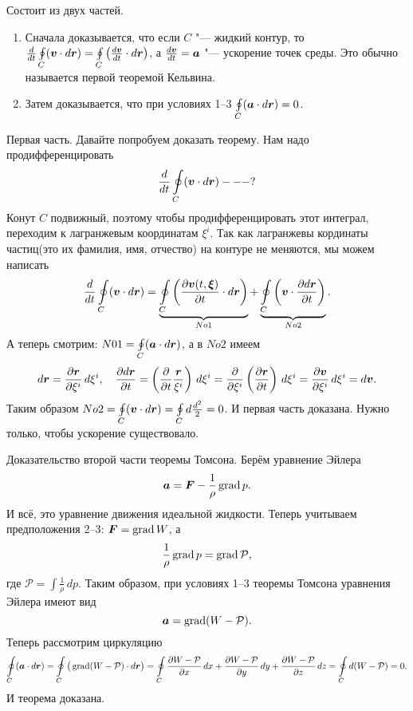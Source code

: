\begin{Proof}
 Состоит из двух частей.
\begin{enumerate}
  \item Сначала доказывается, что если $C$ "--- жидкий контур, то $\frac{d}{dt}\oint\limits_C(\boldsymbol{v}\cdot d\boldsymbol{r}) = \oint\limits_C\left(\frac{d\boldsymbol{v}}{dt}\cdot d\boldsymbol{r}\right)$, а $\frac{d\boldsymbol{v}}{dt} = \boldsymbol{a}$ "--- ускорение точек среды. Это обычно называется первой теоремой Кельвина.
  \item Затем доказывается, что при условиях 1--3 $\oint\limits_C (\boldsymbol{a}\cdot d\boldsymbol{r}) = 0$.
\end{enumerate}

Первая часть. Давайте попробуем доказать теорему. Нам надо продифференцировать
\[
  \frac{d}{dt}\oint\limits_C (\boldsymbol{v}\cdot d\boldsymbol{r}) ---?
\]
Конут $C$ подвижный, поэтому чтобы продифференцировать этот интеграл, переходим к лагранжевым координатам $\xi^i$. Так как лагранжевы кординаты частиц(это их фамилия, имя, отчество) на контуре не меняются, мы можем написать
\[
  \frac{d}{dt}\oint\limits_C (\boldsymbol{v}\cdot d\boldsymbol{r}) = \underbrace{\oint\limits_C\left(\frac{\partial \boldsymbol{v}(t,\boldsymbol{\xi})}{\partial t}\cdot d\boldsymbol{r}\right)}_{No1} + \underbrace{\oint\limits_C\left(\boldsymbol{v}\cdot\frac{\partial d\boldsymbol{r}}{\partial t}\right)}_{No2}.
\]
А теперь смотрим: $N01 = \oint\limits_C (\boldsymbol{a}\cdot d\boldsymbol{r})$, а в $No2$ имеем
\[
  d \boldsymbol{r} = \frac{\partial \boldsymbol{r}}{\partial \xi^i}\,d\xi^i,\quad \frac{\partial d\boldsymbol{r}}{\partial t} = \left(\frac{\partial }{\partial t}\frac{\boldsymbol{r}}{\xi^i}\right)\,d\xi^i = \frac{\partial }{\partial \xi^i}\left(\frac{\partial \boldsymbol{r}}{\partial t}\right)\,d\xi^i = \frac{\partial \boldsymbol{v}}{\partial \xi^i}\,d\xi^i = d\boldsymbol{v}.
\]
Таким образом $No2=\oint\limits_C(\boldsymbol{v}\cdot d\boldsymbol{r}) = \oint\limits_C d\frac{d^2}2 = 0$. И первая часть доказана. Нужно только, чтобы ускорение существовало.

Доказательство второй части теоремы Томсона. Берём уравнение Эйлера
\[
  \boldsymbol{a} = \boldsymbol{F} - \frac1\rho\operatorname{grad} p.
\]
И всё, это уравнение движения идеальной жидкости. Теперь учитываем предположения 2--3: $\boldsymbol{F} = \operatorname{grad} W$, а
\[
  \frac1\rho\operatorname{grad} p = \operatorname{grad}\mathcal P,
\]
где $\mathcal P = \int\frac1\rho\,dp$. Таким образом, при условиях 1--3 теоремы Томсона уравнения Эйлера имеют вид
\[
  \boldsymbol{a} = \operatorname{grad} (W-\mathcal P).
\]
Теперь рассмотрим циркуляцию
\[
  \oint\limits_C(\boldsymbol{a}\cdot d\boldsymbol{r}) = \oint\limits_C\big(\operatorname{grad}(W-\mathcal P)\cdot d\boldsymbol{r}\big) =
  \oint\limits_C\frac{\partial W-\mathcal P}{\partial x}\,dx+\frac{\partial W-\mathcal P}{\partial y}\,dy+\frac{\partial W-\mathcal P}{\partial z}\,dz = \oint\limits_Cd(W-\mathcal P) = 0.
\]
И теорема доказана.
\end{Proof}
